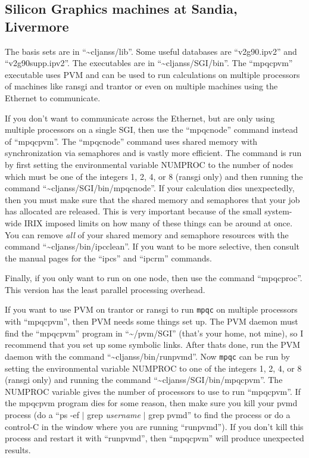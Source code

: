 \subsection{Silicon Graphics machines at Sandia, Livermore}
The basis sets are in ``\~{}cljanss/lib''.  Some useful databases
are ``v2g90.ipv2'' and ``v2g90supp.ipv2''.  The executables
are in ``\~{}cljanss/SGI/bin''.  The ``mpqcpvm'' executable uses
PVM and can be used to run calculations on multiple processors of
machines like ransgi and trantor or even on multiple machines using
the Ethernet to communicate.

If you don't want to communicate across the Ethernet, but are only
using multiple processors on a single SGI, then use the ``mpqcnode'' command
instead of ``mpqcpvm''.  The ``mpqcnode'' command uses shared memory with
synchronization via semaphores and is vastly more efficient.
The command is run by first setting the environmental variable NUMPROC
to the number of nodes which must be one of the integers 1, 2, 4, or 8
(ransgi only) and then running the
command ``\~{}cljanss/SGI/bin/mpqcnode''.
If your calculation dies unexpectedly,
then you must make sure that the shared memory and semaphores that
your job has allocated are released.  This is very important because
of the small system-wide IRIX imposed limits on how many of these things can be
around at once.  You can remove {\em all} of your shared memory and semaphore
resources with the command ``\~{}cljanss/bin/ipcclean''.  If you want
to be more selective, then consult the manual pages for the ``ipcs'' and
``ipcrm'' commands.

Finally, if you only want to run on one node, then use the command
``mpqcproc''.  This version has the least parallel processing overhead.

If you want to use PVM on trantor or ransgi to run {\tt mpqc} on
multiple processors with ``mpqcpvm'', then PVM needs some things set up.
The PVM
daemon must find the ``mpqcpvm'' program in ``\~{}/pvm/SGI'' (that's
your home, not mine), so I recommend that you set up some symbolic links.
After thats done, run the PVM daemon with the command
``\~{}cljanss/bin/runpvmd''.
Now {\tt mpqc} can be run by setting the environmental variable NUMPROC
to one of the integers 1, 2, 4, or 8 (ransgi only) and running the
command ``\~{}cljanss/SGI/bin/mpqcpvm''.  The NUMPROC variable
gives the number of processors to use to run ``mpqcpvm''.
If the mpqcpvm program
dies for some reason, then make sure you kill your pvmd process (do
a ``ps -ef $|$ grep {\it username} $|$ grep pvmd'' to find the process or
do a control-C in the window where you are running ``runpvmd'').
If you don't kill this process and restart it with ``runpvmd'', then
``mpqcpvm'' will produce unexpected results.

